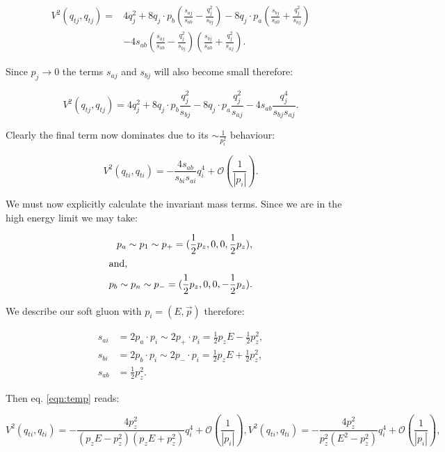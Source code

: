 			\begin{align}
				V^2(q_{tj}, q_{tj}) = &4q_j^2 + 8 q_j\cdot p_b \left(\frac{s_{aj}}{s_{ab}} - \frac{q^2_{j}}{s_{bj}}\right) -
					8q_j\cdot p_a \left(\frac{s_{bj}}{s_{ab}} + \frac{q_j^2}{s_{aj}}\right) \\ &- 4s_{ab}\left(\frac{s_{aj}}{s_{ab}} -
					\frac{q^2_{j}}{s_{bj}}\right)\left(\frac{s_{bj}}{s_{ab}} + \frac{q_j^2}{s_{aj}}\right).
			\end{align}

			Since $p_j\rightarrow0$ the terms $s_{aj}$ and $s_{bj}$ will also become small therefore:

			\begin{equation}
				V^2(q_{tj}, q_{tj}) = 4q_j^2 + 8 q_j\cdot p_b \frac{q^2_{j}}{s_{bj}} - 8 q_j\cdot p_a \frac{q_j^2}{s_{aj}} -
					4s_{ab}\frac{q^4_{j}}{s_{bj}s_{aj}}.
			\end{equation}

			Clearly the final term now dominates due to its $\sim\frac{1}{p_i^2}$ behaviour:

			\begin{equation}
				V^2(q_{ti}, q_{ti}) = - \frac{4s_{ab}}{s_{bi}s_{ai}}q^4_{i} + \mathcal{O}\left(\frac{1}{|p_i|}\right).
				\label{eqn:temp}
			\end{equation}

			We must now explicitly calculate the invariant mass terms.  Since we are in the high energy limit we may take:

			\begin{align}
				p_a\sim p_1 \sim p_+ = (\frac12 p_z, 0, 0, \frac12 p_z),\\
				\intertext{and,}
				p_b\sim p_n \sim p_- = (\frac12 p_z, 0, 0, -\frac12 p_z).
			\end{align}

			We describe our soft gluon with $p_i=(E, \vec{p})$ therefore:

			\begin{align}
				s_{ai} &= 2p_a\cdot p_i\sim2p_+\cdot p_i = \frac12p_zE - \frac12p_z^2,\\
				s_{bi} &= 2p_b\cdot p_i\sim2p_-\cdot p_i = \frac12p_zE + \frac12p_z^2,\\
				s_{ab} &= \frac12p_z^2.
			\end{align}

			Then eq. \eqref{eqn:temp} reads:

			\begin{subequations}
				\begin{equation}
				V^2(q_{ti}, q_{ti}) = - \frac{4p_z^2}{(p_zE - p_z^2)(p_zE + p_z^2)}q^4_{i} + \mathcal{O}\left(\frac{1}{|p_i|}\right),
				\end{equation}
				\begin{equation}
				V^2(q_{ti}, q_{ti}) = - \frac{4p_z^2}{p_z^2(E^2-p_z^2)}q^4_{i} + \mathcal{O}\left(\frac{1}{|p_i|}\right),
				\end{equation}
			\end{subequations}

